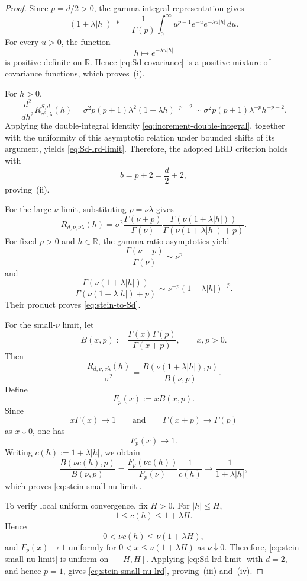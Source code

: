 \documentclass[preprint,12pt,authoryear]{elsarticle}
\begin{document}
\begin{proof}
Since \(p=d/2>0\), the gamma-integral representation gives
\[
(1+\lambda|h|)^{-p}
=
\frac{1}{\Gamma(p)}
\int_0^\infty
u^{p-1}e^{-u}e^{-\lambda u|h|}
\,du.
\]
For every \(u>0\), the function
\[
h\longmapsto e^{-\lambda u|h|}
\]
is positive definite on \(\mathbb R\). Hence
\eqref{eq:Sd-covariance} is a positive mixture of covariance functions,
which proves~(i).

For \(h>0\),
\[
\frac{d^2}{dh^2}
R^{S,d}_{\sigma^2,\lambda}(h)
=
\sigma^2p(p+1)\lambda^2
(1+\lambda h)^{-p-2}
\sim
\sigma^2p(p+1)\lambda^{-p}h^{-p-2}.
\]
Applying the double-integral identity
\eqref{eq:increment-double-integral}, together with the uniformity of
this asymptotic relation under bounded shifts of its argument, yields
\eqref{eq:Sd-lrd-limit}. Therefore, the adopted LRD criterion holds
with
\[
b=p+2=\frac d2+2,
\]
proving~(ii).

For the large-\(\nu\) limit, substituting
\(\rho=\nu\lambda\) gives
\[
R_{d,\nu,\nu\lambda}(h)
=
\sigma^2
\frac{\Gamma(\nu+p)}{\Gamma(\nu)}
\frac{
\Gamma\!\left(\nu(1+\lambda|h|)\right)
}{
\Gamma\!\left(\nu(1+\lambda|h|)+p\right)
}.
\]
For fixed \(p>0\) and \(h\in\mathbb R\), the gamma-ratio asymptotics
yield
\[
\frac{\Gamma(\nu+p)}{\Gamma(\nu)}
\sim\nu^p
\]
and
\[
\frac{
\Gamma\!\left(\nu(1+\lambda|h|)\right)
}{
\Gamma\!\left(\nu(1+\lambda|h|)+p\right)
}
\sim
\nu^{-p}(1+\lambda|h|)^{-p}.
\]
Their product proves \eqref{eq:stein-to-Sd}.

For the small-\(\nu\) limit, let
\[
B(x,p)
:=
\frac{\Gamma(x)\Gamma(p)}{\Gamma(x+p)},
\qquad x,p>0.
\]
Then
\[
\frac{R_{d,\nu,\nu\lambda}(h)}{\sigma^2}
=
\frac{
B\!\left(\nu(1+\lambda|h|),p\right)
}{
B(\nu,p)
}.
\]
Define
\[
F_p(x):=xB(x,p).
\]
Since
\[
x\Gamma(x)\longrightarrow1
\qquad\text{and}\qquad
\Gamma(x+p)\longrightarrow\Gamma(p)
\]
as \(x\downarrow0\), one has
\[
F_p(x)\longrightarrow1.
\]
Writing \(c(h):=1+\lambda|h|\), we obtain
\[
\frac{
B\!\left(\nu c(h),p\right)
}{
B(\nu,p)
}
=
\frac{F_p\!\left(\nu c(h)\right)}{F_p(\nu)}
\frac{1}{c(h)}
\longrightarrow
\frac{1}{1+\lambda|h|},
\]
which proves \eqref{eq:stein-small-nu-limit}.

To verify local uniform convergence, fix \(H>0\). For \(|h|\leq H\),
\[
1\leq c(h)\leq1+\lambda H.
\]
Hence
\[
0<\nu c(h)\leq\nu(1+\lambda H),
\]
and \(F_p(x)\to1\) uniformly for
\(0<x\leq\nu(1+\lambda H)\) as \(\nu\downarrow0\). Therefore,
\eqref{eq:stein-small-nu-limit} is uniform on \([-H,H]\). Applying
\eqref{eq:Sd-lrd-limit} with \(d=2\), and hence \(p=1\), gives
\eqref{eq:stein-small-nu-lrd}, proving~(iii) and~(iv).


\end{proof}
\end{document}
